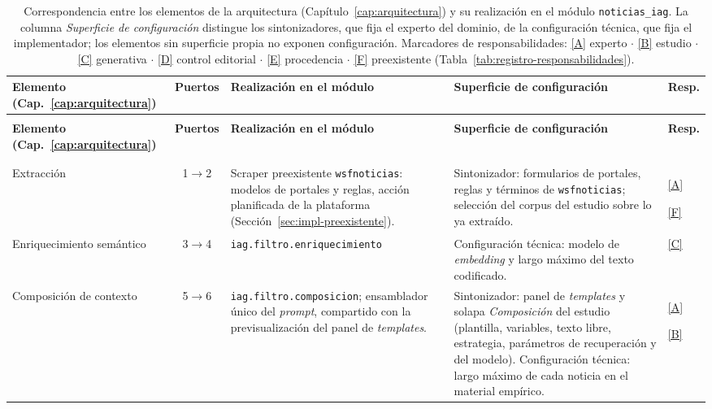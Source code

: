 \documentclass[12pt]{report}
\DeclareRobustCommand{\resp}[1]{\hyperref[tab:registro-responsabilidades]{\textcolor{respcolor}{[#1]}}}
\DeclareRobustCommand{\respleyenda}{Marcadores de responsabilidades: \resp{A} experto \(\cdot\) \resp{B} estudio \(\cdot\) \resp{C} generativa \(\cdot\) \resp{D} control editorial \(\cdot\) \resp{E} procedencia \(\cdot\) \resp{F} preexistente (Tabla~\ref{tab:registro-responsabilidades}).}
\begin{document}
  {
    \footnotesize
    \setlength{\tabcolsep}{3pt}
    \begin{xltabular}{\textwidth}{@{}>{\raggedright\arraybackslash}p{2.3cm} c >{\raggedright\arraybackslash}p{4.8cm} >{\raggedright\arraybackslash}X >{\centering\arraybackslash}p{0.75cm}@{}}
      \caption{Correspondencia entre los elementos de la arquitectura (Capítulo~\ref{cap:arquitectura}) y su realización en el módulo \texttt{noticias\_iag}. La columna \textit{Superficie de configuración} distingue los sintonizadores, que fija el experto del dominio, de la configuración técnica, que fija el implementador; los elementos sin superficie propia no exponen configuración. \respleyenda}
      \label{tab:impl-correspondencia} \\
      \toprule
      \textbf{Elemento (Cap.~\ref{cap:arquitectura})} & \textbf{Puertos} & \textbf{Realización en el módulo} & \textbf{Superficie de configuración} & \textbf{Resp.} \\
      \midrule
      \endfirsthead
       \\
      \toprule
      \textbf{Elemento (Cap.~\ref{cap:arquitectura})} & \textbf{Puertos} & \textbf{Realización en el módulo} & \textbf{Superficie de configuración} & \textbf{Resp.} \\
      \midrule
      \endhead
      \midrule
       \\
      \endfoot
      \bottomrule
      \endlastfoot
       \\
      \addlinespace[2pt]
      Extracción & 1$\to$2 & Scraper preexistente \texttt{wsfnoticias}: modelos de portales y reglas, acción planificada de la plataforma (Sección~\ref{sec:impl-preexistente}). & Sintonizador: formularios de portales, reglas y términos de \texttt{wsfnoticias}; selección del corpus del estudio sobre lo ya extraído. & \resp{A}\par\resp{F}\\
      \addlinespace
      Enriquecimiento semántico & 3$\to$4 & \texttt{iag.filtro.}\allowbreak\texttt{enriquecimiento} & Configuración técnica: modelo de \textit{embedding} y largo máximo del texto codificado. & \resp{C}\\
      \addlinespace
      Composición de contexto & 5$\to$6 & \texttt{iag.filtro.}\allowbreak\texttt{composicion}; ensamblador único del \textit{prompt}, compartido con la previsualización del panel de \textit{templates}. & Sintonizador: panel de \textit{templates} y solapa \textit{Composición} del estudio (plantilla, variables, texto libre, estrategia, parámetros de recuperación y del modelo). Configuración técnica: largo máximo de cada noticia en el material empírico. & \resp{A}\par\resp{B}\\

\end{xltabular}}
\end{document}
